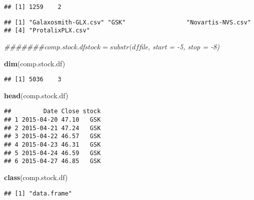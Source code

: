 \documentclass[
]{article}
\newenvironment{Shaded}{\begin{snugshade}}{\end{snugshade}}
\newcommand{\CommentTok}[1]{\textcolor[rgb]{0.56,0.35,0.01}{\textit{#1}}}
\newcommand{\KeywordTok}[1]{\textcolor[rgb]{0.13,0.29,0.53}{\textbf{#1}}}
\newcommand{\NormalTok}[1]{#1}
\newcommand{\OperatorTok}[1]{\textcolor[rgb]{0.81,0.36,0.00}{\textbf{#1}}}
\newcommand{\StringTok}[1]{\textcolor[rgb]{0.31,0.60,0.02}{#1}}
\begin{document}
\begin{verbatim}
## [1] 1259    2
\end{verbatim}

\begin{Shaded}
\end{Shaded}

\begin{verbatim}
## [1] "Galaxosmith-GLX.csv" "GSK"                 "Novartis-NVS.csv"   
## [4] "ProtalixPLX.csv"
\end{verbatim}

\begin{Shaded}
\begin{Highlighting}[]
\CommentTok{#######comp.stock.df$stock = substr(df$file, start = -5, stop = -8)}


\KeywordTok{dim}\NormalTok{(comp.stock.df)}
\end{Highlighting}
\end{Shaded}

\begin{verbatim}
## [1] 5036    3
\end{verbatim}

\begin{Shaded}
\begin{Highlighting}[]
\KeywordTok{head}\NormalTok{(comp.stock.df)}
\end{Highlighting}
\end{Shaded}

\begin{verbatim}
##         Date Close stock
## 1 2015-04-20 47.10   GSK
## 2 2015-04-21 47.24   GSK
## 3 2015-04-22 46.57   GSK
## 4 2015-04-23 46.31   GSK
## 5 2015-04-24 46.59   GSK
## 6 2015-04-27 46.85   GSK
\end{verbatim}

\begin{Shaded}
\begin{Highlighting}[]
\KeywordTok{class}\NormalTok{(comp.stock.df)}
\end{Highlighting}
\end{Shaded}

\begin{verbatim}
## [1] "data.frame"
\end{verbatim}
\end{document}

